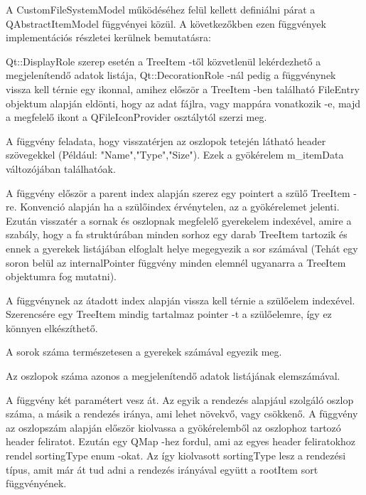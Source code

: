 \begin{sloppypar}
A {\ttfamily CustomFileSystemModel} működéséhez felül kellett 
definiálni párat a {\ttfamily QAbstractItemModel} függvényei közül. 
A következőkben ezen függvények implementációs részletei kerülnek bemutatásra:

\begin{description}[font=\normalfont\itshape\space]
\item [data:]
{\ttfamily Qt::DisplayRole} szerep esetén a {\ttfamily TreeItem} -től 
közvetlenül lekérdezhető a megjelenítendő adatok listája,
{\ttfamily Qt::DecorationRole} -nál pedig
a függvénynek vissza kell térnie egy ikonnal, 
amihez először a 
{\ttfamily TreeItem} -ben található {\ttfamily FileEntry} objektum alapján eldönti, 
hogy az adat fájlra, vagy mappára vonatkozik -e, 
majd a megfelelő ikont a {\ttfamily QFileIconProvider} osztálytól szerzi meg. 
\item [headerData:]
A függvény feladata, hogy visszatérjen 
az oszlopok tetején látható 
header szövegekkel (Például: "Name","Type","Size"). 
Ezek a gyökérelem
{\ttfamily m\_itemData} változójában találhatóak.
\item [index:]
A függvény először a parent index alapján szerez egy pointert 
a szülő {\ttfamily TreeItem} -re. 
Konvenció alapján ha a szülőindex érvénytelen, 
az a gyökérelemet jelenti. 
Ezután visszatér a sornak és oszlopnak megfelelő gyerekelem indexével, 
amire a szabály, 
hogy a fa struktúrában minden sorhoz egy darab {\ttfamily TreeItem} tartozik 
és ennek a gyerekek listájában elfoglalt helye megegyezik 
a sor számával (Tehát egy soron belül 
az {\ttfamily internalPointer} függvény minden elemnél ugyanarra 
a {\ttfamily TreeItem} objektumra fog mutatni).
\item [parent:]
A függvénynek az átadott index alapján
vissza kell térnie a szülőelem indexével. 
Szerencsére egy {\ttfamily TreeItem} mindig tartalmaz pointer -t a szülőelemre, 
így ez könnyen elkészíthető.
\item [rowCount:]
A sorok száma természetesen a gyerekek számával egyezik meg. 
\item [columnCount:]
Az oszlopok száma azonos a megjelenítendő adatok listájának elemszámával.
\item [sort:]
A függvény két paramétert vesz át. 
Az egyik a rendezés alapjául szolgáló oszlop száma, 
a másik a rendezés iránya,
ami lehet növekvő, vagy csökkenő. 
A függvény az oszlopszám alapján először kiolvassa a gyökérelemből 
az oszlophoz tartozó header feliratot. 
Ezután egy {\ttfamily QMap} -hez fordul, 
ami az egyes header feliratokhoz rendel {\ttfamily sortingType} enum -okat. 
Az így kiolvasott {\ttfamily sortingType} lesz a rendezési típus, 
amit már át tud adni a rendezés irányával együtt 
a {\ttfamily rootItem} {\ttfamily sort} függvényének.
\end{description}
\end{sloppypar}

